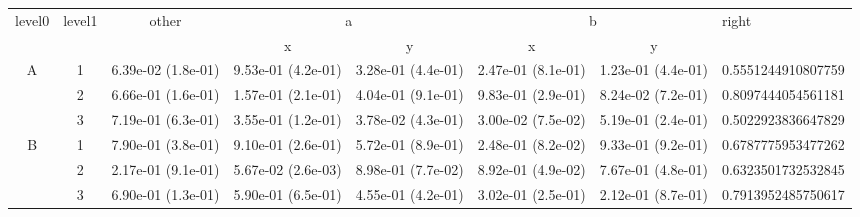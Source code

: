 \begin{tabular}{cccccccl}
\toprule
\multirow{2}{*}{level0} & \multirow{2}{*}{level1}& \multirow{2}{*}{other}&\multicolumn{2}{c}{a}&\multicolumn{2}{c}{b}& \multirow{2}{*}{right}\tabularnewline
\cmidrule(lr){4-5}
\cmidrule(lr){6-7}
&&&x&y&x&y\tabularnewline
\midrule
\multirow{3}{*}{A}&1& 6.39e-02 (1.8e-01)& 9.53e-01 (4.2e-01)& 3.28e-01 (4.4e-01)& 2.47e-01 (8.1e-01)& 1.23e-01 (4.4e-01)& 0.5551244910807759\tabularnewline
&2& 6.66e-01 (1.6e-01)& 1.57e-01 (2.1e-01)& 4.04e-01 (9.1e-01)& 9.83e-01 (2.9e-01)& 8.24e-02 (7.2e-01)& 0.8097444054561181\tabularnewline
&3& 7.19e-01 (6.3e-01)& 3.55e-01 (1.2e-01)& 3.78e-02 (4.3e-01)& 3.00e-02 (7.5e-02)& 5.19e-01 (2.4e-01)& 0.5022923836647829\tabularnewline
\midrule
\multirow{3}{*}{B}&1& 7.90e-01 (3.8e-01)& 9.10e-01 (2.6e-01)& 5.72e-01 (8.9e-01)& 2.48e-01 (8.2e-02)& 9.33e-01 (9.2e-01)& 0.6787775953477262\tabularnewline
&2& 2.17e-01 (9.1e-01)& 5.67e-02 (2.6e-03)& 8.98e-01 (7.7e-02)& 8.92e-01 (4.9e-02)& 7.67e-01 (4.8e-01)& 0.6323501732532845\tabularnewline
&3& 6.90e-01 (1.3e-01)& 5.90e-01 (6.5e-01)& 4.55e-01 (4.2e-01)& 3.02e-01 (2.5e-01)& 2.12e-01 (8.7e-01)& 0.7913952485750617\tabularnewline
\bottomrule
\end{tabular}
